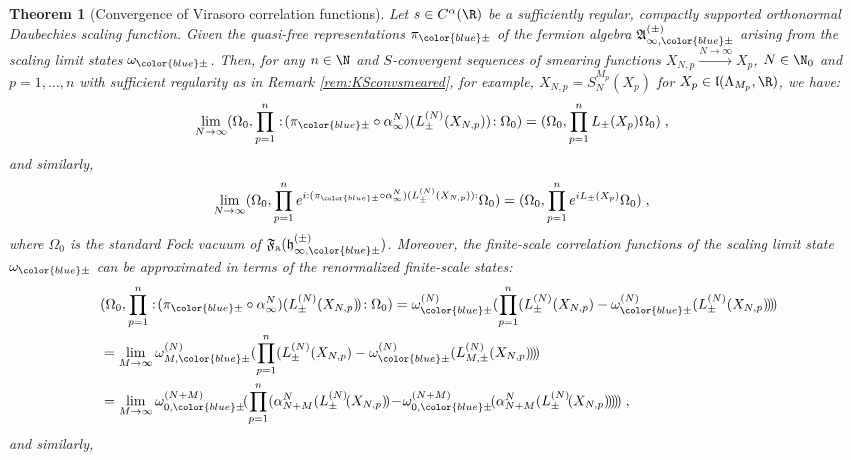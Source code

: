 \documentclass[a4paper, 11pt]{article}
\newcommand{\fA}{\mathfrak{A}}\newcommand{\cA}{\mathcal{A}}\newcommand{\dA}{\mathds{A}}\newcommand{\sA}{\mathscr{A}}
\newcommand{\ua}{\textup a}
\newcommand{\fF}{\mathfrak{F}}\newcommand{\cF}{\mathcal{F}}\newcommand{\dF}{\mathds{F}}\newcommand{\sF}{\mathscr{F}}
\newcommand{\fh}{\mathfrak{h}}
\newcommand{\fl}{\mathfrak{l}}\newcommand{\cl}{\mathcal{l}}
\DeclareMathOperator{\1}{\mathds{1}}
\newtheorem{thm}{Theorem} [section]
\begin{document}
\begin{thm}[Convergence of Virasoro correlation functions]
\label{thm:corapproxvir}
Let $s\in C^{\alpha}(\R)$ be a sufficiently regular, compactly supported orthonormal Daubechies scaling function. Given the quasi-free representations $\pi_{{\color{blue}\pm}}$ of the fermion algebra $\fA^{(\pm)}_{\infty,{\color{blue}\pm}}$ arising from the scaling limit states $\omega_{{\color{blue}\pm}}$. Then, for any $n\in\N$ and $S$-convergent sequences of smearing functions $X_{N,p}\stackrel{N\rightarrow\infty}{\rightarrow} X_{p}$, $N\in\N_{0}$ and $p=1,...,n$ with sufficient regularity as in Remark \ref{rem:KSconvsmeared}, for example, $X_{N,p} = S^{M_{p}}_{N}(X_{p})$ for $X_{p}\in\fl(\Lambda_{M_{p}},\R)$, we have:
\begin{align*}
\lim_{N\rightarrow\infty}(\Omega_{0},\prod_{p=1}^{n}:\!(\pi_{{\color{blue}\pm}}\circ\alpha^{N}_{\infty})(L^{(N)}_{\pm}(X_{N,p}))\!:\Omega_{0}) & = (\Omega_{0},\prod_{p=1}^{n}L_{\pm}(X_{p})\Omega_{0})\;,
\end{align*}
and similarly,
\begin{align*}
\lim_{N\rightarrow\infty}(\Omega_{0},\prod_{p=1}^{n}e^{i:(\pi_{{\color{blue}\pm}}\circ\alpha^{N}_{\infty})(L^{(N)}_{\pm}(X_{N,p})):}\Omega_{0}) & = (\Omega_{0},\prod_{p=1}^{n}e^{iL_{\pm}(X_{p})}\Omega_{0})\;,
\end{align*}
where $\Omega_{0}$ is the standard Fock vacuum of $\fF_{\ua}(\fh^{(\pm)}_{\infty,{\color{blue}\pm}})$. Moreover, the finite-scale correlation functions of the scaling limit state $\omega_{{\color{blue}\pm}}$ can be approximated in terms of the renormalized finite-scale states:
\begin{align*}
& (\Omega_{0},\prod_{p=1}^{n}:\!(\pi_{{\color{blue}\pm}}\circ\alpha^{N}_{\infty})(L^{(N)}_{\pm}(X_{N,p})\!)\!:\Omega_{0}) = \omega^{(N)}_{{\color{blue}\pm}}(\prod_{p=1}^{n}(L^{(N)}_{\pm}(X_{N,p})-\omega^{(N)}_{{\color{blue}\pm}}(L^{(N)}_{\pm}(X_{N,p})\!)\!)\!) \\
& = \lim_{M\rightarrow\infty}\omega^{(N)}_{M,{\color{blue}\pm}}(\prod_{p=1}^{n}(L^{(N)}_{\pm}(X_{N,p})-\omega^{(N)}_{{\color{blue}\pm}}(L^{(N)}_{M,\pm}(X_{N,p})\!)\!)\!) \\
& = \lim_{M\rightarrow\infty}\omega^{(N+M)}_{0,{\color{blue}\pm}}\!(\prod_{p=1}^{n}(\alpha^{N}_{N+M}(L^{(N)}_{\pm}\!(X_{N,p})\!)\!-\!\omega^{(N+M)}_{0,{\color{blue}\pm}}\!(\alpha^{N}_{N+M}(L^{(N)}_{\pm}\!(X_{N,p})\!)\!)\!)\!) \;,
\end{align*}
and similarly,
\begin{align*}

\end{align*}
\end{thm}
\end{document}
